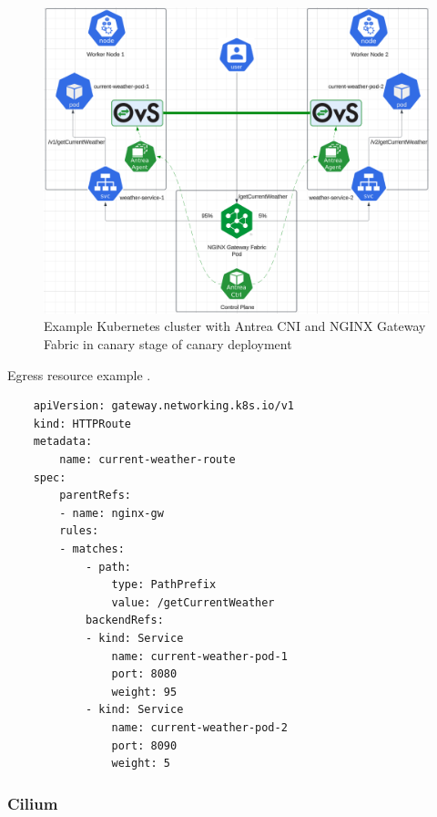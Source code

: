 \begin{figure}[H]
    \centering
    \includegraphics[width=1\columnwidth]{images/antrea-nginx.png}
    \caption{Example Kubernetes cluster with Antrea CNI and NGINX Gateway Fabric in canary stage of canary deployment}
    \label{fig:canaryAntreaImg}
\end{figure}

\begin{listing}[htb]
    \centering
    \caption{Egress resource example \cite{AntreaEgressArch}.}
    \begin{verbatim}
    apiVersion: gateway.networking.k8s.io/v1
    kind: HTTPRoute
    metadata:
        name: current-weather-route
    spec:
        parentRefs:
        - name: nginx-gw
        rules:
        - matches:
            - path:
                type: PathPrefix
                value: /getCurrentWeather
            backendRefs:
            - kind: Service
                name: current-weather-pod-1
                port: 8080
                weight: 95
            - kind: Service
                name: current-weather-pod-2
                port: 8090
                weight: 5
    \end{verbatim}
    \label{lst:yamlAntreaIngressCanaryHTTPRoute}
\end{listing}

\subsubsection{Cilium}
\label{subsection:ciliumIngress}

